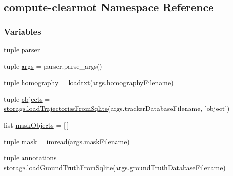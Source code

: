 \hypertarget{namespacecompute-clearmot}{\subsection{compute-\/clearmot Namespace Reference}
\label{namespacecompute-clearmot}
}
\subsubsection*{Variables}
\begin{DoxyCompactItemize}
\item 
tuple \hyperlink{namespacecompute-clearmot_ad3bd2e52122d02473330a4fbe63b978a}{parser}
\item 
tuple \hyperlink{namespacecompute-clearmot_a47a5abb52dee7ddad848f2fad0a0b9b5}{args} = parser.\-parse\-\_\-args()
\item 
tuple \hyperlink{namespacecompute-clearmot_a5edb0e829730c5829319525b889bd397}{homography} = loadtxt(args.\-homography\-Filename)
\item 
tuple \hyperlink{namespacecompute-clearmot_a4ebfb33f7f61805c131e08b6c021827d}{objects} = \hyperlink{namespacestorage_aaafba9f6bc0816ff0084df5e1d892a9d}{storage.\-load\-Trajectories\-From\-Sqlite}(args.\-tracker\-Database\-Filename, 'object')
\item 
list \hyperlink{namespacecompute-clearmot_a4f294254ea03e7d3752d568cb63dc734}{mask\-Objects} = \mbox{[}$\,$\mbox{]}
\item 
tuple \hyperlink{namespacecompute-clearmot_ae649842464dfab87258a46f244b71ca3}{mask} = imread(args.\-mask\-Filename)
\item 
tuple \hyperlink{namespacecompute-clearmot_a1778137e8796b2628575fc799ae04556}{annotations} = \hyperlink{namespacestorage_aa3adae129d45a66fe22312bd3db7b43c}{storage.\-load\-Ground\-Truth\-From\-Sqlite}(args.\-ground\-Truth\-Database\-Filename)
\end{DoxyCompactItemize}


